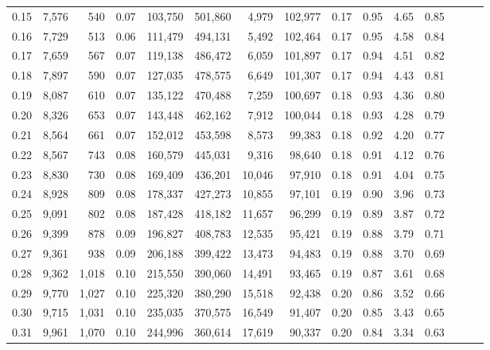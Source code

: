 \begin{tabular}{rrrrrrrrrrrrrrr}
0.15 &   7,576 &    540 &  0.07 &  103,750 &  501,860 &    4,979 &  102,977 &  0.17 &  0.95 &  4.65 &      0.85 \\
0.16 &   7,729 &    513 &  0.06 &  111,479 &  494,131 &    5,492 &  102,464 &  0.17 &  0.95 &  4.58 &      0.84 \\
0.17 &   7,659 &    567 &  0.07 &  119,138 &  486,472 &    6,059 &  101,897 &  0.17 &  0.94 &  4.51 &      0.82 \\
0.18 &   7,897 &    590 &  0.07 &  127,035 &  478,575 &    6,649 &  101,307 &  0.17 &  0.94 &  4.43 &      0.81 \\
0.19 &   8,087 &    610 &  0.07 &  135,122 &  470,488 &    7,259 &  100,697 &  0.18 &  0.93 &  4.36 &      0.80 \\
0.20 &   8,326 &    653 &  0.07 &  143,448 &  462,162 &    7,912 &  100,044 &  0.18 &  0.93 &  4.28 &      0.79 \\
0.21 &   8,564 &    661 &  0.07 &  152,012 &  453,598 &    8,573 &   99,383 &  0.18 &  0.92 &  4.20 &      0.77 \\
0.22 &   8,567 &    743 &  0.08 &  160,579 &  445,031 &    9,316 &   98,640 &  0.18 &  0.91 &  4.12 &      0.76 \\
0.23 &   8,830 &    730 &  0.08 &  169,409 &  436,201 &   10,046 &   97,910 &  0.18 &  0.91 &  4.04 &      0.75 \\
0.24 &   8,928 &    809 &  0.08 &  178,337 &  427,273 &   10,855 &   97,101 &  0.19 &  0.90 &  3.96 &      0.73 \\
0.25 &   9,091 &    802 &  0.08 &  187,428 &  418,182 &   11,657 &   96,299 &  0.19 &  0.89 &  3.87 &      0.72 \\
0.26 &   9,399 &    878 &  0.09 &  196,827 &  408,783 &   12,535 &   95,421 &  0.19 &  0.88 &  3.79 &      0.71 \\
0.27 &   9,361 &    938 &  0.09 &  206,188 &  399,422 &   13,473 &   94,483 &  0.19 &  0.88 &  3.70 &      0.69 \\
0.28 &   9,362 &  1,018 &  0.10 &  215,550 &  390,060 &   14,491 &   93,465 &  0.19 &  0.87 &  3.61 &      0.68 \\
0.29 &   9,770 &  1,027 &  0.10 &  225,320 &  380,290 &   15,518 &   92,438 &  0.20 &  0.86 &  3.52 &      0.66 \\
0.30 &   9,715 &  1,031 &  0.10 &  235,035 &  370,575 &   16,549 &   91,407 &  0.20 &  0.85 &  3.43 &      0.65 \\
0.31 &   9,961 &  1,070 &  0.10 &  244,996 &  360,614 &   17,619 &   90,337 &  0.20 &  0.84 &  3.34 &      0.63 \\

\end{tabular}
